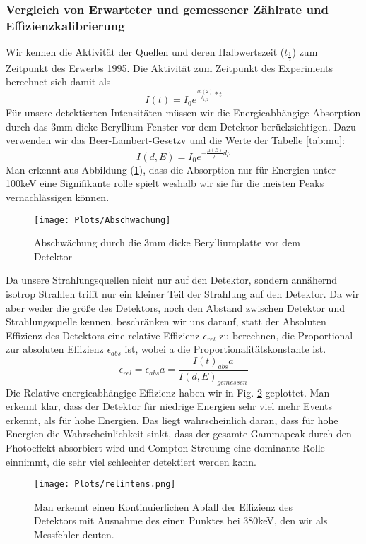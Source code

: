 \documentclass[]{article}
\begin{document}
	
	\subsubsection{Vergleich von Erwarteter und gemessener Zählrate und Effizienzkalibrierung}
	Wir kennen die Aktivität der Quellen und deren Halbwertszeit ($t_\frac{1}{2}$) zum Zeitpunkt des Erwerbs 1995. Die Aktivität zum Zeitpunkt des Experiments berechnet sich damit als
	\begin{equation}
	I(t)=I_0e^{\frac{ln(2)}{t_{1/2}}*t}
	\end{equation}
	Für unsere detektierten Intensitäten müssen wir die Energieabhängige Absorption durch das 3mm dicke Beryllium-Fenster vor dem Detektor berücksichtigen. Dazu verwenden wir das Beer-Lambert-Gesetzv und die Werte der Tabelle \ref{tab:mu}:
	\begin{equation}
	I(d,E)=I_0e^{-\frac{\mu(E)}{\rho}d\rho}
	\end{equation} 
	Man erkennt aus Abbildung (\ref{fig:abschwachung}), dass die Absorption nur für Energien unter 100keV eine Signifikante rolle spielt weshalb wir sie für die meisten Peaks vernachlässigen können.
	\begin{figure}
		\centering
		\texttt{[image: Plots/Abschwachung]}
		\caption{Abschwächung durch die 3mm dicke Berylliumplatte vor dem Detektor}
		\label{fig:abschwachung}
	\end{figure}
	
	Da unsere Strahlungsquellen nicht nur auf den Detektor, sondern annähernd isotrop Strahlen trifft nur ein kleiner Teil der Strahlung auf den Detektor. Da wir aber weder die größe des Detektors, noch den Abstand zwischen Detektor und Strahlungsquelle kennen, beschränken wir uns darauf, statt der Absoluten Effizienz des Detektors eine relative Effizienz $\epsilon_{rel}$ zu berechnen, die Proportional zur absoluten Effizienz $\epsilon_{abs}$ ist, wobei a die Proportionalitätskonstante ist.
	\begin{equation}
	\epsilon_{rel}=\epsilon_{abs}a=\frac{I(t)_{abs}a}{I(d,E)_{gemessen}}
	\end{equation}
	Die Relative energieabhängige Effizienz haben wir in Fig. \ref{fig:relintens} geplottet. Man erkennt klar, dass der Detektor für niedrige Energien sehr viel mehr Events erkennt, als für hohe Energien. Das liegt wahrscheinlich daran, dass für hohe Energien die Wahrscheinlichkeit sinkt, dass der gesamte Gammapeak durch den Photoeffekt absorbiert wird und Compton-Streuung eine dominante Rolle einnimmt, die sehr viel schlechter detektiert werden kann.
	\begin{figure}
		\centering
		\texttt{[image: Plots/relintens.png]}
		\caption{Man erkennt einen Kontinuierlichen Abfall der Effizienz des Detektors mit Ausnahme des einen Punktes bei 380keV, den wir als Messfehler deuten. }
		\label{fig:relintens}
	\end{figure}
	
\end{document}
